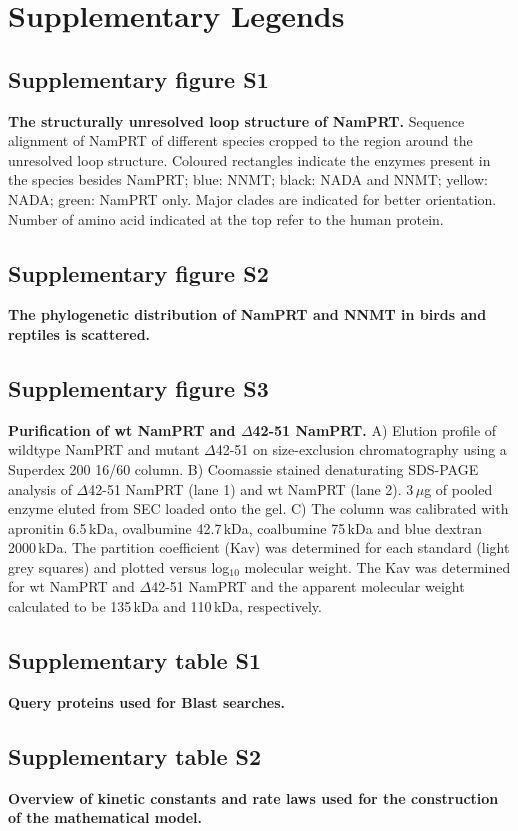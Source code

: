 
\section*{Supplementary Legends}

\subsection*{Supplementary figure S1}

\textbf{The structurally unresolved loop structure of NamPRT.} Sequence alignment of NamPRT of different species cropped to the region around the unresolved loop structure. Coloured rectangles indicate the enzymes present in the species besides NamPRT; blue: NNMT; black: NADA and NNMT; yellow: NADA; green: NamPRT only. Major clades are indicated for better orientation. Number of amino acid indicated at the top refer to the human protein.


\subsection*{Supplementary figure S2}

\textbf{The phylogenetic distribution of NamPRT and NNMT in birds and reptiles is scattered.}


\subsection*{Supplementary figure S3}

\textbf{Purification of wt NamPRT and $\Delta$42-51 NamPRT.} A) Elution profile of wildtype NamPRT and mutant $\Delta$42-51 on size-exclusion chromatography using a Superdex 200 16/60 column. B) Coomassie stained denaturating SDS-PAGE analysis of $\Delta$42-51 NamPRT (lane 1) and wt NamPRT (lane 2). 3\,$\mu$g of pooled enzyme eluted from SEC loaded onto the gel. C) The column was calibrated with apronitin 6.5\,kDa, ovalbumine 42.7\,kDa, coalbumine 75\,kDa and blue dextran 2000\,kDa. The partition coefficient (Kav) was determined for each standard (light grey squares) and plotted versus log$_{10}$ molecular weight. The Kav was determined for wt NamPRT and $\Delta$42-51 NamPRT and the apparent molecular weight calculated to be 135\,kDa and 110\,kDa, respectively.


\subsection*{Supplementary table S1}

\textbf{Query proteins used for Blast searches.}


\subsection*{Supplementary table S2}

\textbf{Overview of kinetic constants and rate laws used for the construction of the mathematical model.}
